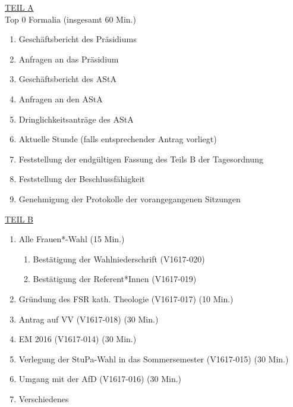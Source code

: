 \documentclass[ngerman,headheight=70pt]{scrartcl}
\begin{document}
    \underline{TEIL A}\\
    Top 0 Formalia (insgesamt 60 Min.)
    \begin{enumerate}
        \item Geschäftsbericht des Präsidiums
        \item Anfragen an das Präsidium
        \item Geschäftsbericht des AStA
        \item Anfragen an den AStA
        \item Dringlichkeitsanträge des AStA
        \item Aktuelle Stunde (falls entsprechender Antrag vorliegt)
        \item Feststellung der endgültigen Fassung des Teils B der Tagesordnung
        \item Feststellung der Beschlussfähigkeit
        \item Genehmigung der Protokolle der vorangegangenen Sitzungen
    \end{enumerate}
    \vspace{0.2cm}
    \underline{TEIL B}\\
    \begin{enumerate}[label={\textbf{Top \theenumi}},leftmargin=*]
        \item Alle Frauen*-Wahl (15 Min.)
        \begin{enumerate}
            \item Bestätigung der Wahlniederschrift (V1617-020)
            \item Bestätigung der Referent*Innen (V1617-019)
        \end{enumerate}
        \item Gründung des FSR kath. Theologie (V1617-017) (10 Min.)
        \item Antrag auf VV (V1617-018) (30 Min.)
        \item EM 2016 (V1617-014) (30 Min.)
        \item Verlegung der StuPa-Wahl in das Sommersemester (V1617-015) (30 Min.)
        \item Umgang mit der AfD (V1617-016) (30 Min.)
        \item Verschiedenes
    \end{enumerate}
\end{document}
